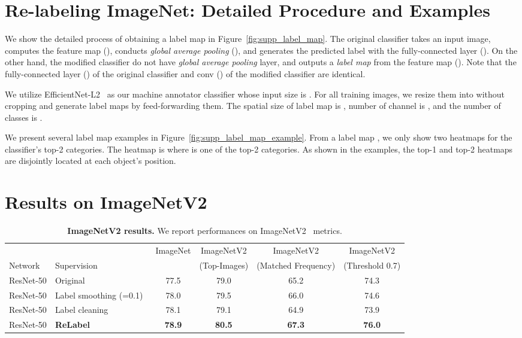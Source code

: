 \documentclass[final]{cvpr}
\newcommand\oursb{{\textbf{\mbox{ReLabel}}}\xspace}
\begin{document}
\section{Re-labeling ImageNet: Detailed Procedure and Examples}
\label{supp:label_maps}

We show the detailed process of obtaining a label map in Figure~\ref{fig:supp_label_map}.
The original classifier takes an input image, computes the feature map (), conducts \textit{global average pooling} (), and generates the predicted label  with the fully-connected layer (). 
On the other hand, the modified classifier do not have \textit{global average pooling} layer, and outputs a \textit{label map}  from the feature map (). 
Note that the fully-connected layer () of the original classifier and  conv () of the modified classifier are identical.

We utilize EfficientNet-L2~\cite{xie2020noisy_student} as our machine annotator classifier whose input size is . 
For all training images, we resize them into  without cropping and generate label maps by feed-forwarding them. 
The spatial size of label map  is , number of channel  is , and the number of classes  is .

We present several label map examples in Figure~\ref{fig:supp_label_map_example}.
From a label map , we only show two heatmaps for the classifier's top-2 categories. The heatmap is  where  is one of the top-2 categories. 
As shown in the examples, the top-1 and top-2 heatmaps are disjointly located at each object's position.
 \section{Results on ImageNetV2}
\label{supp:imagenet_v2}

\begin{table*}
\centering
\tabcolsep=0.1cm
\begin{tabular}{@{}llcccc@{}}
\toprule
& & ImageNet &  ImageNetV2 & ImageNetV2 &  ImageNetV2\\
Network\hspace{2em} & Supervision & & {\small (Top-Images)} &  {\small (Matched Frequency)} & {\small (Threshold 0.7)} \\
            
\midrule
ResNet-50 & Original  & 77.5 & 79.0 & 65.2 & 74.3 \\
ResNet-50 & Label smoothing (=0.1)~\cite{szegedy2016rethinking_labelsm} & 78.0 & 79.5 & 66.0 & 74.6 \\
ResNet-50 & Label cleaning~\cite{beyer2020are_we_done}  & 78.1 & 79.1 & 64.9 & 73.9 \\ 
ResNet-50 & \oursb   & \textbf{78.9} & \textbf{80.5} & \textbf{67.3} & \textbf{76.0}  \\ 
\bottomrule
\end{tabular}
\caption{\textbf{ImageNetV2 results.} 
We report performances on ImageNetV2~\cite{recht2019imagenetv2} metrics.
}
\label{table:supp_imagenetv2}
\end{table*}
\end{document}
